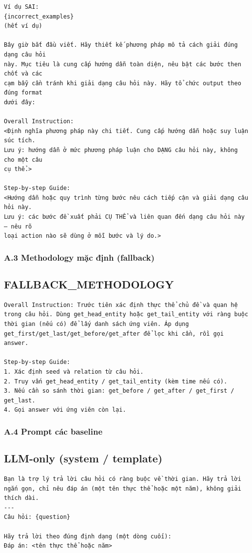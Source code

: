 \begin{lstlisting}
Ví dụ SAI:
{incorrect_examples}
(hết ví dụ)

Bây giờ bắt đầu viết. Hãy thiết kế phương pháp mô tả cách giải đúng dạng câu hỏi
này. Mục tiêu là cung cấp hướng dẫn toàn diện, nêu bật các bước then chốt và các
cạm bẫy cần tránh khi giải dạng câu hỏi này. Hãy tổ chức output theo đúng format
dưới đây:

Overall Instruction:
<Định nghĩa phương pháp này chi tiết. Cung cấp hướng dẫn hoặc suy luận súc tích.
Lưu ý: hướng dẫn ở mức phương pháp luận cho DẠNG câu hỏi này, không cho một câu
cụ thể.>

Step-by-step Guide:
<Hướng dẫn hoặc quy trình từng bước nêu cách tiếp cận và giải dạng câu hỏi này.
Lưu ý: các bước đề xuất phải CỤ THỂ và liên quan đến dạng câu hỏi này — nêu rõ
loại action nào sẽ dùng ở mỗi bước và lý do.>
\end{lstlisting}

\subsubsection*{A.3 Methodology mặc định (fallback)}

\subsection*{FALLBACK\_METHODOLOGY}
\begin{lstlisting}
Overall Instruction: Trước tiên xác định thực thể chủ đề và quan hệ trong câu hỏi. Dùng get_head_entity hoặc get_tail_entity với ràng buộc thời gian (nếu có) để lấy danh sách ứng viên. Áp dụng get_first/get_last/get_before/get_after để lọc khi cần, rồi gọi answer.

Step-by-step Guide:
1. Xác định seed và relation từ câu hỏi.
2. Truy vấn get_head_entity / get_tail_entity (kèm time nếu có).
3. Nếu cần so sánh thời gian: get_before / get_after / get_first / get_last.
4. Gọi answer với ứng viên còn lại.
\end{lstlisting}

\subsubsection*{A.4 Prompt các baseline}

\subsection*{LLM-only (system / template)}
\begin{lstlisting}
Bạn là trợ lý trả lời câu hỏi có ràng buộc về thời gian. Hãy trả lời ngắn gọn, chỉ nêu đáp án (một tên thực thể hoặc một năm), không giải thích dài.
---
Câu hỏi: {question}

Hãy trả lời theo đúng định dạng (một dòng cuối):
Đáp án: <tên thực thể hoặc năm>
\end{lstlisting}

